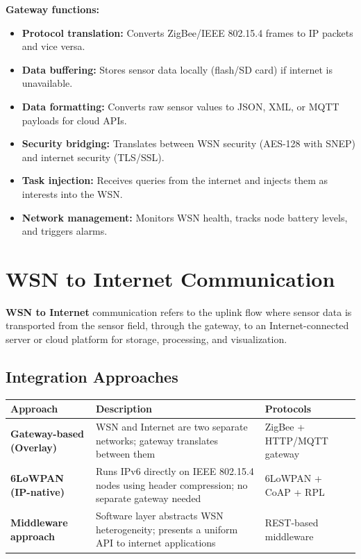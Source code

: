 \documentclass[12pt,a4paper]{article}
\renewcommand{\arraystretch}{1.45}
\begin{document}
\textbf{Gateway functions:}
\begin{itemize}[leftmargin=*, itemsep=3pt]
  \item \textbf{Protocol translation:} Converts ZigBee/IEEE 802.15.4 frames to IP packets and vice versa.
  \item \textbf{Data buffering:} Stores sensor data locally (flash/SD card) if internet is unavailable.
  \item \textbf{Data formatting:} Converts raw sensor values to JSON, XML, or MQTT payloads for cloud APIs.
  \item \textbf{Security bridging:} Translates between WSN security (AES-128 with SNEP) and internet security (TLS/SSL).
  \item \textbf{Task injection:} Receives queries from the internet and injects them as interests into the WSN.
  \item \textbf{Network management:} Monitors WSN health, tracks node battery levels, and triggers alarms.
\end{itemize}

\section{WSN to Internet Communication}

\begin{tcolorbox}[defbox, title={\textbf{WSN-to-Internet Communication}}]
\textbf{WSN to Internet} communication refers to the uplink flow where sensor data is transported from the sensor field, through the gateway, to an Internet-connected server or cloud platform for storage, processing, and visualization.
\end{tcolorbox}

\subsection{Integration Approaches}

\par\noindent
{\renewcommand{\arraystretch}{1.5}%
\begin{tabularx}{\linewidth}{|B{3.2cm}|Y|Y|}
\hline
\textbf{Approach} & \textbf{Description} & \textbf{Protocols} \\
\hline
\textbf{Gateway-based (Overlay)} & WSN and Internet are two separate networks; gateway translates between them & ZigBee + HTTP/MQTT gateway \\
\hline
\textbf{6LoWPAN (IP-native)} & Runs IPv6 directly on IEEE 802.15.4 nodes using header compression; no separate gateway needed & 6LoWPAN + CoAP + RPL \\
\hline
\textbf{Middleware approach} & Software layer abstracts WSN heterogeneity; presents a uniform API to internet applications & REST-based middleware \\
\hline
\end{tabularx}}
\end{document}
